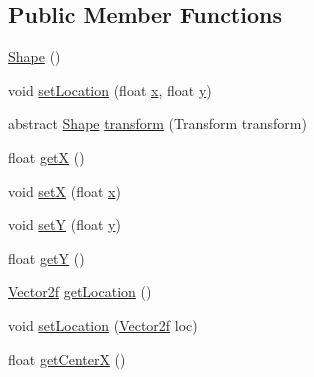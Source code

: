\subsection*{Public Member Functions}
\begin{DoxyCompactItemize}
\item 
\mbox{\hyperlink{classorg_1_1newdawn_1_1slick_1_1geom_1_1_shape_ab4721f44d2bdecd9d65a56181589b4b1}{Shape}} ()
\item 
void \mbox{\hyperlink{classorg_1_1newdawn_1_1slick_1_1geom_1_1_shape_a8dde2a46d3b696843e530545c0935a97}{set\+Location}} (float \mbox{\hyperlink{classorg_1_1newdawn_1_1slick_1_1geom_1_1_shape_a3e985bfff386c15a4efaad03d8ad60d3}{x}}, float \mbox{\hyperlink{classorg_1_1newdawn_1_1slick_1_1geom_1_1_shape_a9f934baded6a1b65ebb69e7e5f80ea00}{y}})
\item 
abstract \mbox{\hyperlink{classorg_1_1newdawn_1_1slick_1_1geom_1_1_shape}{Shape}} \mbox{\hyperlink{classorg_1_1newdawn_1_1slick_1_1geom_1_1_shape_a463826a085479c379e40f012e970b997}{transform}} (Transform transform)
\item 
float \mbox{\hyperlink{classorg_1_1newdawn_1_1slick_1_1geom_1_1_shape_a736a47bfdd6f164558b43fd497a3a3f3}{getX}} ()
\item 
void \mbox{\hyperlink{classorg_1_1newdawn_1_1slick_1_1geom_1_1_shape_a1469b8ef682642c4257869640c27bf16}{setX}} (float \mbox{\hyperlink{classorg_1_1newdawn_1_1slick_1_1geom_1_1_shape_a3e985bfff386c15a4efaad03d8ad60d3}{x}})
\item 
void \mbox{\hyperlink{classorg_1_1newdawn_1_1slick_1_1geom_1_1_shape_a7a127d0dea9bd7f0e3ce3fd0a61268fc}{setY}} (float \mbox{\hyperlink{classorg_1_1newdawn_1_1slick_1_1geom_1_1_shape_a9f934baded6a1b65ebb69e7e5f80ea00}{y}})
\item 
float \mbox{\hyperlink{classorg_1_1newdawn_1_1slick_1_1geom_1_1_shape_a5f334f962d8fc525d522fe0f8ac20b35}{getY}} ()
\item 
\mbox{\hyperlink{classorg_1_1newdawn_1_1slick_1_1geom_1_1_vector2f}{Vector2f}} \mbox{\hyperlink{classorg_1_1newdawn_1_1slick_1_1geom_1_1_shape_a2684b748f3637b2095ec56e46403e5e1}{get\+Location}} ()
\item 
void \mbox{\hyperlink{classorg_1_1newdawn_1_1slick_1_1geom_1_1_shape_abdb96498ceae960e9915154efed60f27}{set\+Location}} (\mbox{\hyperlink{classorg_1_1newdawn_1_1slick_1_1geom_1_1_vector2f}{Vector2f}} loc)
\item 
float \mbox{\hyperlink{classorg_1_1newdawn_1_1slick_1_1geom_1_1_shape_aa8f8cb519727d4ef8737819b4f1dd7b6}{get\+CenterX}} ()

\end{DoxyCompactItemize}
